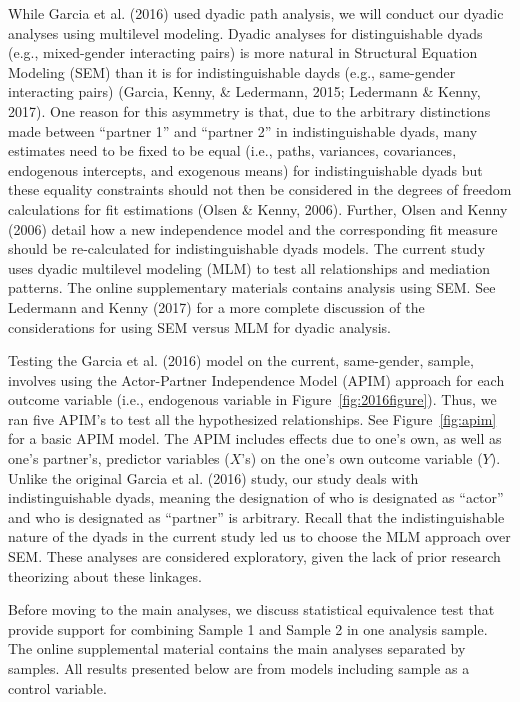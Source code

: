 \documentclass[man]{apa6}
\begin{document}
While Garcia et al. (2016) used dyadic path analysis, we will conduct
our dyadic analyses using multilevel modeling. Dyadic analyses for
distinguishable dyads (e.g., mixed-gender interacting pairs) is more
natural in Structural Equation Modeling (SEM) than it is for
indistinguishable dayds (e.g., same-gender interacting pairs) (Garcia,
Kenny, \& Ledermann, 2015; Ledermann \& Kenny, 2017). One reason for
this asymmetry is that, due to the arbitrary distinctions made between
\enquote{partner 1} and \enquote{partner 2} in indistinguishable dyads,
many estimates need to be fixed to be equal (i.e., paths, variances,
covariances, endogenous intercepts, and exogenous means) for
indistinguishable dyads but these equality constraints should not then
be considered in the degrees of freedom calculations for fit estimations
(Olsen \& Kenny, 2006). Further, Olsen and Kenny (2006) detail how a new
independence model and the corresponding fit measure should be
re-calculated for indistinguishable dyads models. The current study uses
dyadic multilevel modeling (MLM) to test all relationships and mediation
patterns. The online supplementary materials contains analysis using
SEM. See Ledermann and Kenny (2017) for a more complete discussion of
the considerations for using SEM versus MLM for dyadic analysis.

Testing the Garcia et al. (2016) model on the current, same-gender,
sample, involves using the Actor-Partner Independence Model (APIM)
approach for each outcome variable (i.e., endogenous variable in
Figure~\ref{fig:2016figure}). Thus, we ran five APIM's to test all the
hypothesized relationships. See Figure~\ref{fig:apim} for a basic APIM
model. The APIM includes effects due to one's own, as well as one's
partner's, predictor variables (\(X\)'s) on the one's own outcome
variable (\(Y\)). Unlike the original Garcia et al. (2016) study, our
study deals with indistinguishable dyads, meaning the designation of who
is designated as \enquote{actor} and who is designated as
\enquote{partner} is arbitrary. Recall that the indistinguishable nature
of the dyads in the current study led us to choose the MLM approach over
SEM. These analyses are considered exploratory, given the lack of prior
research theorizing about these linkages.

Before moving to the main analyses, we discuss statistical equivalence
test that provide support for combining Sample 1 and Sample 2 in one
analysis sample. The online supplemental material contains the main
analyses separated by samples. All results presented below are from
models including sample as a control variable.
\end{document}
